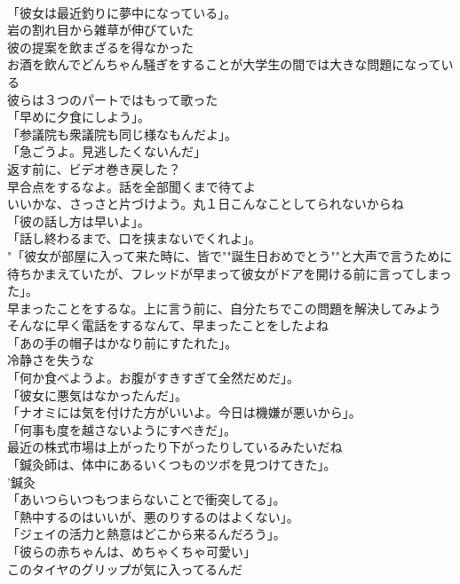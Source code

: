 \documentclass[8pt]{extreport}
\begin{document}
\begin{CJK}{UTF8}{min}
\\	「彼女は最近釣りに夢中になっている」。	
\\	岩の割れ目から雑草が伸びていた	
\\	彼の提案を飲まざるを得なかった	
\\	お酒を飲んでどんちゃん騒ぎをすることが大学生の間では大きな問題になっている	
\\	彼らは３つのパートではもって歌った	
\\	「早めに夕食にしよう」。	
\\	「参議院も衆議院も同じ様なもんだよ」。	
\\	「急ごうよ。見逃したくないんだ」	
\\	返す前に、ビデオ巻き戻した？	
\\	早合点をするなよ。話を全部聞くまで待てよ	
\\	いいかな、さっさと片づけよう。丸１日こんなことしてられないからね	
\\	「彼の話し方は早いよ」。	
\\	「話し終わるまで、口を挟まないでくれよ」。	
\\	"「彼女が部屋に入って来た時に、皆で""誕生日おめでとう""と大声で言うために待ちかまえていたが、フレッドが早まって彼女がドアを開ける前に言ってしまった」。
\\	早まったことをするな。上に言う前に、自分たちでこの問題を解決してみよう	
\\	そんなに早く電話をするなんて、早まったことをしたよね	
\\	「あの手の帽子はかなり前にすたれた」。	
\\	冷静さを失うな	
\\	「何か食べようよ。お腹がすきすぎて全然だめだ」。	
\\	「彼女に悪気はなかったんだ」。	
\\	「ナオミには気を付けた方がいいよ。今日は機嫌が悪いから」。	
\\	「何事も度を越さないようにすべきだ」。	
\\	最近の株式市場は上がったり下がったりしているみたいだね	
\\	「鍼灸師は、体中にあるいくつものツボを見つけてきた」。	
\\	'鍼灸
\\	「あいつらいつもつまらないことで衝突してる」。	
\\	「熱中するのはいいが、悪のりするのはよくない」。	
\\	「ジェイの活力と熱意はどこから来るんだろう」。	
\\	「彼らの赤ちゃんは、めちゃくちゃ可愛い」	
\\	このタイヤのグリップが気に入ってるんだ	

\end{CJK}
\end{document}

